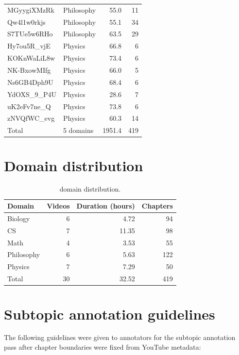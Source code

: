 \begin{table}[h]
\begin{tabular}{llrr}
    MGyygiXMzRk & Philosophy & 55.0 & 11 \\
    Qw4l1w0rkjs & Philosophy & 55.1 & 34 \\
    S7TUe5w6RHo & Philosophy & 63.5 & 29 \\
    Hy7ou5R\_vjE & Physics & 66.8 & 6 \\
    KOKnWaLiL8w & Physics & 73.4 & 6 \\
    NK-BxowMIfg & Physics & 66.0 & 5 \\
    Ns6GB4Dph9U & Physics & 68.4 & 6 \\
    YdOXS\_9\_P4U & Physics & 28.6 & 7 \\
    uK2eFv7ne\_Q & Physics & 73.8 & 6 \\
    zNVQfWC\_evg & Physics & 60.3 & 14 \\
    \midrule
    Total & 5 domains & 1951.4 & 419 \\
    \bottomrule
  \end{tabular}
\end{table}

\section{Domain distribution}

\begin{table}[h]
  \centering
  \caption{\dataset{} domain distribution.}
  \label{tab:domain_distribution}
  \begin{tabular}{lrrr}
    \toprule
    Domain & Videos & Duration (hours) & Chapters \\
    \midrule
    Biology & 6 & 4.72 & 94 \\
    CS & 7 & 11.35 & 98 \\
    Math & 4 & 3.53 & 55 \\
    Philosophy & 6 & 5.63 & 122 \\
    Physics & 7 & 7.29 & 50 \\
    \midrule
    Total & 30 & 32.52 & 419 \\
    \bottomrule
  \end{tabular}
\end{table}

\section{Subtopic annotation guidelines}

The following guidelines were given to annotators for the subtopic annotation
pass after chapter boundaries were fixed from YouTube metadata:

